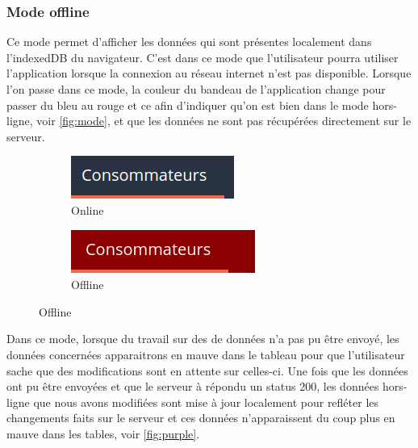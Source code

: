 \documentclass{EPL-master-thesis-covers-FR}
\begin{document}
			\subsubsection*{Mode offline}
			
				Ce mode permet d'afficher les données qui sont présentes localement dans l'indexedDB du navigateur. C'est dans ce mode que l'utilisateur pourra utiliser l'application lorsque la connexion au réseau internet n'est pas disponible. Lorsque l'on passe dans ce mode, la couleur du bandeau de l'application change pour passer du bleu au rouge et ce afin d'indiquer qu'on est bien dans le mode hors-ligne, voir \ref{fig:mode}, et que les données ne sont pas récupérées directement sur le serveur.
								
				\begin{figure}[H]
					\caption{Mode}
					\label{fig:mode}
					\centering
					\begin{subfigure}[b]{0.3\textwidth}
  						\includegraphics[width=1\linewidth]{images/consumer_blue}
  						\caption{Online}
					\end{subfigure}%
					\begin{subfigure}[b]{0.333\textwidth}
  						\includegraphics[width=1\linewidth]{images/consumer_red}
  						\caption{Offline}
					\end{subfigure}
					\label{fig:test}
				\end{figure}
			
				Dans ce mode, lorsque du travail sur des de données n'a pas pu être envoyé, les données concernées apparaitrons en mauve dans le tableau pour que l'utilisateur sache que des modifications sont en attente sur celles-ci. Une fois que les données ont pu être envoyées et que le serveur à répondu un status 200, les données hors-ligne que nous avons modifiées sont mise à jour localement pour refléter les changements faits sur le serveur et ces données n'apparaissent du coup plus en mauve dans les tables, voir \ref{fig:purple}. 
				
\end{document}
